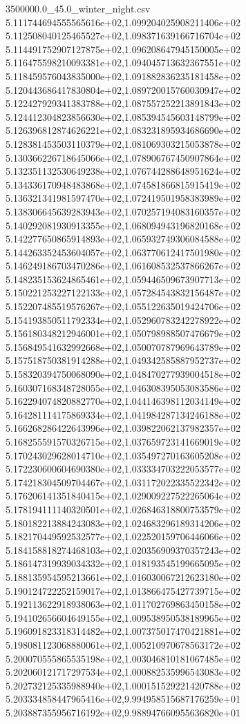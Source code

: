 \begin{filecontents*}{3500000.0_45.0_winter_night.csv}
5.111744694555565616e+02,1.099204025908211406e+02
5.112508040125465527e+02,1.098371639166716704e+02
5.114491752907127875e+02,1.096208647945150005e+02
5.116475598210093381e+02,1.094045713632367551e+02
5.118459576043835000e+02,1.091882836235181458e+02
5.120443686417830804e+02,1.089720015760030947e+02
5.122427929341383788e+02,1.087557252213891843e+02
5.124412304823856630e+02,1.085394545603148799e+02
5.126396812874626221e+02,1.083231895934686690e+02
5.128381453503110379e+02,1.081069303215053878e+02
5.130366226718645066e+02,1.078906767450907864e+02
5.132351132530649238e+02,1.076744288648951624e+02
5.134336170948483868e+02,1.074581866815915419e+02
5.136321341981597470e+02,1.072419501958383989e+02
5.138306645639283943e+02,1.070257194083160357e+02
5.140292081930913355e+02,1.068094943196820168e+02
5.142277650865914893e+02,1.065932749306084588e+02
5.144263352453604057e+02,1.063770612417501980e+02
5.146249186703470286e+02,1.061608532537866267e+02
5.148235153624865461e+02,1.059446509673907713e+02
5.150221253227122133e+02,1.057284543832156487e+02
5.152207485519576267e+02,1.055122635019424706e+02
5.154193850511792334e+02,1.052960783242278922e+02
5.156180348212946001e+02,1.050798988507476679e+02
5.156849541632992668e+02,1.050070787969643789e+02
5.157518750381914288e+02,1.049342585887952737e+02
5.158320394750068090e+02,1.048470277939004518e+02
5.160307168348728055e+02,1.046308395053083586e+02
5.162294074820882770e+02,1.044146398112034149e+02
5.164281114175869334e+02,1.041984287134246188e+02
5.166268286422643996e+02,1.039822062137982357e+02
5.168255591570326715e+02,1.037659723141669019e+02
5.170243029628014710e+02,1.035497270163605208e+02
5.172230600604690380e+02,1.033334703222053577e+02
5.174218304509704467e+02,1.031172022335522342e+02
5.176206141351840415e+02,1.029009227522265064e+02
5.178194111140320501e+02,1.026846318800753579e+02
5.180182213884243083e+02,1.024683296189314206e+02
5.182170449592532577e+02,1.022520159706446066e+02
5.184158818274468103e+02,1.020356909370357243e+02
5.186147319939034332e+02,1.018193545199665095e+02
5.188135954595213661e+02,1.016030067212623180e+02
5.190124722252159017e+02,1.013866475427739715e+02
5.192113622918938063e+02,1.011702769863450158e+02
5.194102656604649155e+02,1.009538950538189965e+02
5.196091823318314482e+02,1.007375017470421881e+02
5.198081123068880061e+02,1.005210970678563172e+02
5.200070555865535198e+02,1.003046810181067485e+02
5.202060121717297534e+02,1.000882535996543083e+02
5.202732125335988940e+02,1.000151529221420788e+02
5.203334858447965416e+02,9.994958515687176259e+01
5.203887355956716192e+02,9.988947660955636820e+01

\end{filecontents*}
